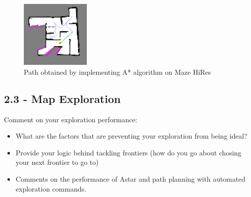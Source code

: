 \documentclass[journal,onecolumn]{IEEEtran}
\begin{document}
\begin{figure}[H]
\centering
\includegraphics[width=0.3\textwidth]{Media/22.png}
\caption{Path obtained by implementing A* algorithm on Maze HiRes}
\end{figure}

\subsection*{2.3 - Map Exploration} 

Comment on your exploration performance:
 \begin{itemize}
    \item What are the factors that are preventing your exploration from being ideal?
    \item Provide your logic behind tackling frontiers (how do you go about chosing your next frontier to go to)
    \item Comments on the performance of Astar and path planning with automated exploration commands.
\end{itemize}





\ifCLASSOPTIONcaptionsoff
  \newpage
\fi

\nocite{*}


\end{document}

